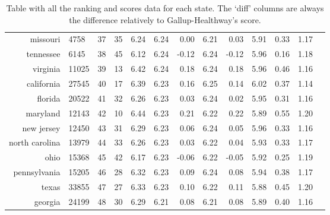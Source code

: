 \documentclass{llncs}
\begin{document}
\begin{landscape}
\begin{table}
\begin{tabular}{rlrrrrrrrrrrr}
    missouri & 4758 &  37 &  35 & 6.24 & 6.24 & 0.00 & 6.21 & 0.03 & 5.91 & 0.33 & 1.17 \\
    tennessee & 6145 &  38 &  45 & 6.12 & 6.24 & -0.12 & 6.24 & -0.12 & 5.96 & 0.16 & 1.18 \\
    virginia & 11025 &  39 &  13 & 6.42 & 6.24 & 0.18 & 6.24 & 0.18 & 5.96 & 0.46 & 1.16 \\
    california & 27545 &  40 &  17 & 6.39 & 6.23 & 0.16 & 6.25 & 0.14 & 6.02 & 0.37 & 1.14 \\
    florida & 20522 &  41 &  32 & 6.26 & 6.23 & 0.03 & 6.24 & 0.02 & 5.95 & 0.31 & 1.16 \\
    maryland & 12143 &  42 &  10 & 6.44 & 6.23 & 0.21 & 6.22 & 0.22 & 5.89 & 0.55 & 1.20 \\
    new jersey & 12450 &  43 &  31 & 6.29 & 6.23 & 0.06 & 6.24 & 0.05 & 5.96 & 0.33 & 1.16 \\
    north carolina & 13979 &  44 &  33 & 6.26 & 6.23 & 0.03 & 6.22 & 0.04 & 5.93 & 0.33 & 1.17 \\
    ohio & 15368 &  45 &  42 & 6.17 & 6.23 & -0.06 & 6.22 & -0.05 & 5.92 & 0.25 & 1.19 \\
    pennsylvania & 15205 &  46 &  28 & 6.32 & 6.23 & 0.09 & 6.24 & 0.08 & 5.94 & 0.38 & 1.17 \\
    texas & 33855 &  47 &  27 & 6.33 & 6.23 & 0.10 & 6.22 & 0.11 & 5.88 & 0.45 & 1.20 \\
    georgia & 24199 &  48 &  30 & 6.29 & 6.21 & 0.08 & 6.21 & 0.08 & 5.89 & 0.40 & 1.16 \\
   \hline
\end{tabular}
\caption{Table with all the ranking and scores data for each state. The `diff' columns are always the difference relatively to Gallup-Healthway's score.}
\end{table}

\end{landscape}
\restoregeometry
\end{document}
